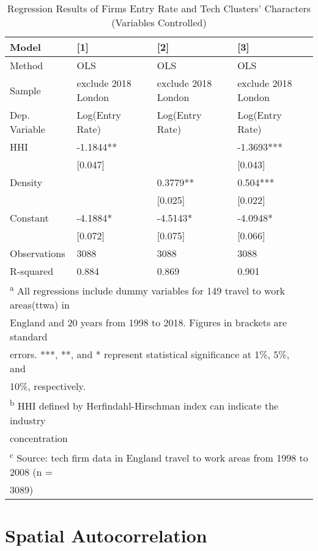 \documentclass[
  12pt,
  oneside]{book}
\begin{document}
\begin{table}

\caption{\label{tab:tab-regression-control-var}Regression Results of Firms Entry Rate and Tech Clusters' Characters (Variables Controlled)}
\centering
\begin{tabular}[t]{llll}
\toprule
\textbf{Model} & \textbf{{}[1]} & \textbf{{}[2]} & \textbf{{}[3]}\\
\midrule
Method & OLS & OLS & OLS\\
Sample & exclude 2018 London & exclude 2018 London & exclude 2018 London\\
Dep. Variable & Log(Entry Rate) & Log(Entry Rate) & Log(Entry Rate)\\
\midrule
HHI & -1.1844** &  & -1.3693***\\
 & {}[0.047] &  & {}[0.043]\\
\addlinespace
Density &  & 0.3779** & 0.504***\\
 &  & {}[0.025] & {}[0.022]\\
Constant & -4.1884* & -4.5143* & -4.0948*\\
 & {}[0.072] & {}[0.075] & {}[0.066]\\
\midrule
Observations & 3088 & 3088 & 3088\\
\addlinespace
R-squared & 0.884 & 0.869 & 0.901\\
\bottomrule
\multicolumn{4}{l}{\textsuperscript{a} All regressions include dummy variables for 149 travel to work areas(ttwa) in}\\
\multicolumn{4}{l}{England and 20 years from 1998 to 2018. Figures in brackets are standard}\\
\multicolumn{4}{l}{errors. ***, **, and * represent statistical significance at 1\%, 5\%, and}\\
\multicolumn{4}{l}{10\%, respectively.}\\
\multicolumn{4}{l}{\textsuperscript{b} HHI defined by Herfindahl-Hirschman index can indicate the industry}\\
\multicolumn{4}{l}{concentration}\\
\multicolumn{4}{l}{\textsuperscript{c} Source: tech firm data in England travel to work areas from 1998 to 2008 (n =}\\
\multicolumn{4}{l}{3089)}\\
\end{tabular}
\end{table}

\hypertarget{spatial-autocorrelation}{%
\section{Spatial Autocorrelation}\label{spatial-autocorrelation}}
\end{document}
